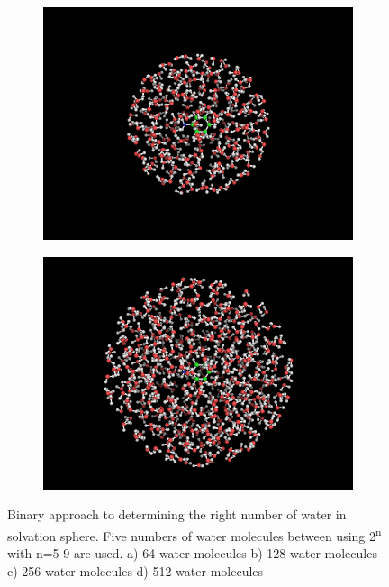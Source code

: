 \documentclass[
journal=jpcbfk, %
manuscript=article]{achemso}
\begin{document}
\begin{figure}[!tbp]
\begin{subfigure}[b]{0.4\textwidth}
		\caption{}
		\label{fig:startingGeometryAnilineb)}
	\end{subfigure}
	\hfill
	\begin{subfigure}[b]{0.4\textwidth}
		\includegraphics[width=1\textwidth]{startingGeometry/aniline256.png}
		\caption{}
		\label{fig:startingGeometryAnilinec)}
	\end{subfigure}
	\hfill
	\begin{subfigure}[b]{0.4\textwidth}
		\includegraphics[width=1\textwidth]{startingGeometry/aniline512.png}
		\caption{}
		\label{fig:startingGeometryAnilined)}
	\end{subfigure}
	\caption{Binary approach to determining the right number of water in solvation sphere. Five numbers of water molecules between using 2\textsuperscript{n} with n=5-9 are used. a) 64 water molecules b) 128 water molecules c) 256 water molecules d) 512 water molecules}
\end{figure}
	
\end{document}
